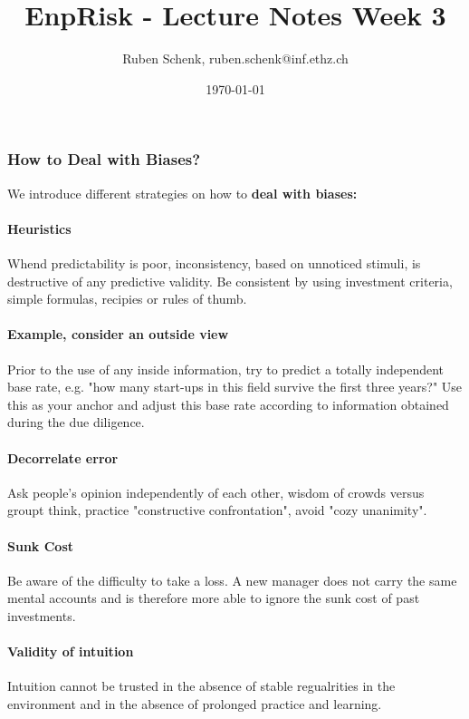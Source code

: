 \documentclass[a4paper]{extarticle}
\title{EnpRisk - Lecture Notes Week 3}
\author{Ruben Schenk, ruben.schenk@inf.ethz.ch}
\date{\today}
\begin{document}
\maketitle
\newpage

\subsubsection{How to Deal with Biases?}

We introduce different strategies on how to \textbf{deal with biases:}

\paragraph{Heuristics} Whend predictability is poor, inconsistency, based on unnoticed stimuli, is destructive of any predictive validity. Be consistent by using investment criteria, simple formulas, recipies or rules of thumb.

\paragraph{Example, consider an outside view} Prior to the use of any inside information, try to predict a totally independent base rate, e.g. "how many start-ups in this field survive the first three years?" Use this as your anchor and adjust this base rate according to information obtained during the due diligence.

\paragraph{Decorrelate error} Ask people's opinion independently of each other, wisdom of crowds versus groupt think, practice "constructive confrontation", avoid "cozy unanimity".

\paragraph{Sunk Cost} Be aware of the difficulty to take a loss. A new manager does not carry the same mental accounts and is therefore more able to ignore the sunk cost of past investments.

\paragraph{Validity of intuition} Intuition cannot be trusted in the absence of stable regualrities in the environment and in the absence of prolonged practice and learning.
\end{document}
